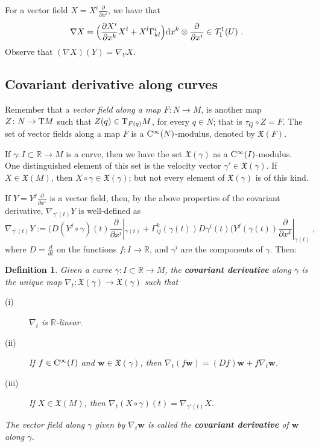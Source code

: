 \documentclass[12pt]{report}
\newtheorem{definition}[teor]{Definition}
\def\derpar#1#2{\frac{\partial{#1}}{\partial{#2}}}
\def\vf{\mathfrak X}
\def\d{{\rm d}}
\def\Real{\mathbb{R}}
\def\Tan{{\rm T}}
\def\Cinfty{{\rm C}^\infty}
\begin{document}
For a vector field $\displaystyle X=X^i{\frac{\partial}{\partial x^{i}}}$, we have that 
$$\nabla X=\Big(\derpar{X^i}{x^k}X^i+X^l\Gamma_{kl}^i\Big)\d x^k\otimes{\frac{\partial}{\partial x^{i}}}\in\mathcal{T}_{1}^{1}(U)\ .
$$
Observe that $(\nabla X)(Y)=\nabla_YX$.


\subsection{Covariant derivative along curves}


Remember that a {\sl vector field along a map}
$F\colon N\to M$, is another map $Z\colon N\to\Tan M$ 
such that $Z(q)\in \Tan_{F(q)}M$, for every $q\in N$; that is $\tau_Q\circ Z=F$. 
The set of vector fields along a map $F$ is a $\Cinfty(N)$-modulus, denoted by $\vf(F)$.

If $\gamma\colon I\subset\Real\to M$ is a curve, 
then we have the set $\vf(\gamma)$ as a $\Cinfty(I)$-modulus. 
One distinguished element of this set is the velocity vector $\gamma'\in\vf(\gamma)$. 
If $X\in\vf(M)$, then $X\circ\gamma\in\vf(\gamma)$;
but not every element of $\vf(\gamma)$ is of this kind.

If $\displaystyle Y=Y^{j}\derpar{}{x^i}$ is a vector field, 
then, by the above properties of the covariant derivative, 
$\nabla_{\gamma'(t)}Y$ is well-defined as
$$
\nabla_{\gamma'(t)}Y:=(D(Y^{j}\circ\gamma)(t){\frac{\partial}{\partial x^{i}}}|_{\gamma(t)}+\Gamma_{ij}^{k}(\gamma(t))D\gamma^{i}(t)(Y^{j}(\gamma(t)){\frac{\partial}{\partial x^{k}}}|_{\gamma(t)} \ ,
$$
where $\displaystyle D=\frac{d}{d t}$ on the functions $f:I\to\Real$, and $\gamma^{i}$ are the components of $\gamma$. Then:

\begin{definition}
Given a curve $\gamma\colon I\subset\Real\to M$,
the \textbf{covariant derivative} along $\gamma$
is the unique map $\nabla_{t}\colon\vf(\gamma)\to\vf(\gamma)$ 
such that
\begin{description}
\item[{\rm (i)}] 
$\nabla_{t}$ is $\Real$-linear.
\item[{\rm (ii)}]
 If $f\in\Cinfty(I)$ and $\mathbf{w}\in\vf(\gamma)$, then
$\nabla_{t}(f\mathbf{w})=(Df)\mathbf{w}+f\nabla_{t}\mathbf{w}$.
\item[{\rm (iii)}] 
If $X\in\vf(M)$, then $\nabla_{t}(X\circ\gamma) (t)=\nabla_{\gamma'(t)}X$.
\end{description}
The vector field along $\gamma$ given by $\nabla_{t}\mathbf{w}$ is called the
 \textbf{covariant derivative} of $\mathbf{w}$ along $\gamma$.
\end{definition}
\end{document}
